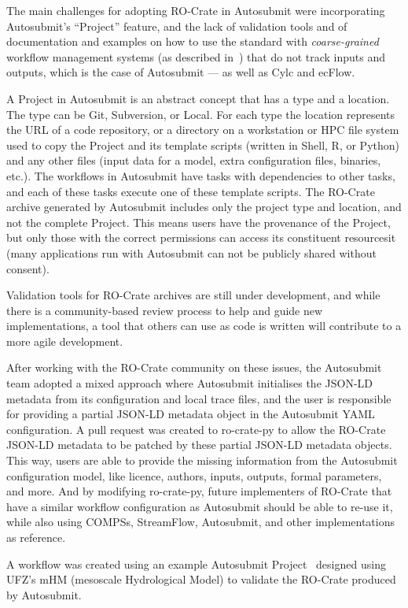 \documentclass[10pt,letterpaper]{article}
\begin{document}
The main challenges for adopting RO-Crate in Autosubmit were incorporating Autosubmit's ``Project'' feature, and the lack of validation tools and of documentation and examples on how to use the standard with \emph{coarse-grained} workflow management systems (as described in~\cite{Goble 2020}) that do not track inputs and outputs, which is the case of Autosubmit --- as well as Cylc and ecFlow.

A Project in Autosubmit is an abstract concept that has a type and a location.
The type can be Git, Subversion, or Local.
For each type the location represents the URL of a code repository, or a directory on a workstation or HPC file system used to copy the Project and its template scripts (written in Shell, R, or Python) and any other files (input data for a model, extra configuration files, binaries, etc.).
The workflows in Autosubmit have tasks with dependencies to other tasks, and each of these tasks execute one of these template scripts.
The RO-Crate archive generated by Autosubmit includes only the project type and location, and not the complete Project.
This means users have the provenance of the Project, but only those with the correct permissions can access its constituent resourcesit (many applications run with Autosubmit can not be publicly shared without consent).

Validation tools for RO-Crate archives are still under development, and while there is a community-based review process to help and guide new implementations, a tool that others can use as code is written will contribute to a more agile development.

After working with the RO-Crate community on these issues, the Autosubmit team adopted a mixed approach where Autosubmit initialises the JSON-LD metadata from its configuration and local trace files, and the user is responsible for providing a partial JSON-LD metadata object in the Autosubmit YAML configuration.
A pull request was created to ro-crate-py to allow the RO-Crate JSON-LD metadata to be patched by these partial JSON-LD metadata objects.
This way, users are able to provide the missing information from the Autosubmit configuration model, like licence, authors, inputs, outputs, formal parameters, and more.
And by modifying ro-crate-py, future implementers of RO-Crate that have a similar workflow configuration as Autosubmit should be able to re-use it, while also using COMPSs, StreamFlow, Autosubmit, and other implementations as reference.

A workflow was created using an example Autosubmit Project~\cite{Kinoshita 2023} designed using UFZ's mHM (mesoscale Hydrological Model)
\cite{Samaniego 2010,Kumar 2013} to validate the RO-Crate produced by Autosubmit.
\end{document}
